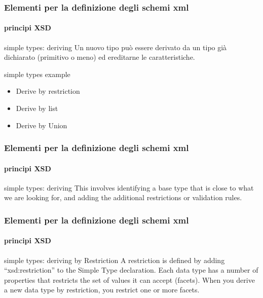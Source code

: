\begin{frame}
	\frametitle{Elementi per la definizione degli schemi xml}
	\framesubtitle{principi XSD}
	\addtocounter{nframe}{1}

	\begin{block}{simple types: deriving}
		Un nuovo tipo può essere derivato da un tipo già dichiarato (primitivo o meno) ed ereditarne le caratteristiche.
	\end{block}

	\begin{block}{simple types example}
		\begin{itemize}
			\item Derive by restriction
			\item Derive by list
			\item Derive by Union
		\end{itemize}
	\end{block}

\end{frame}

\begin{frame}
	\frametitle{Elementi per la definizione degli schemi xml}
	\framesubtitle{principi XSD}
	\addtocounter{nframe}{1}

	\begin{block}{simple types: deriving}
		This involves identifying a base type that is close to what we are looking for, and adding the additional restrictions or validation rules.
	\end{block}

\end{frame}

\begin{frame}
	\frametitle{Elementi per la definizione degli schemi xml}
	\framesubtitle{principi XSD}
	\addtocounter{nframe}{1}

	\begin{block}{simple types: deriving by Restriction}
		A restriction is defined by adding ``xsd:restriction'' to the Simple Type declaration. Each data type has a number of properties that restricts the set of values it can accept (facets). When you derive a new data type by restriction, you restrict one or more facets.
	\end{block}

\end{frame}

